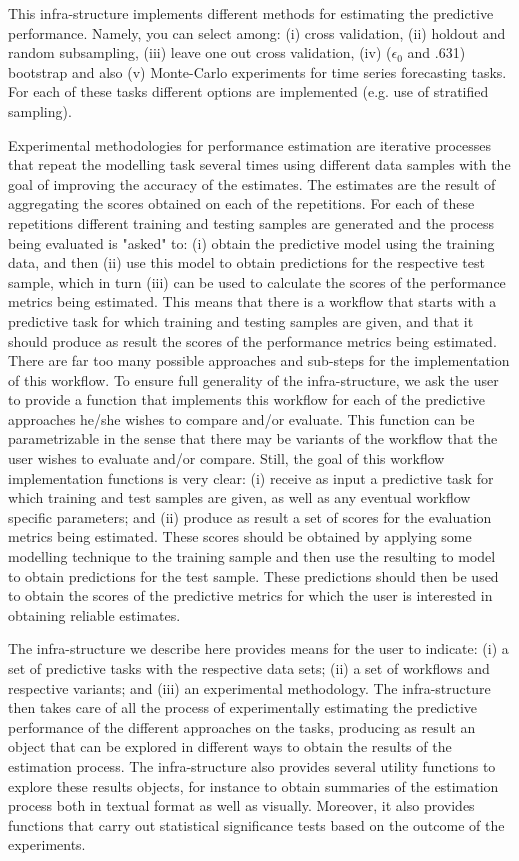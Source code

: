 \documentclass[10pt,a4paper]{article}\usepackage[]{graphicx}\usepackage[]{color}
\begin{document}
This infra-structure implements different methods for estimating the predictive performance. Namely, you can select among:  (i) cross validation, (ii) holdout and random subsampling, (iii) leave one out cross validation, (iv) ($\epsilon_0$ and .631) bootstrap and also (v) Monte-Carlo experiments for time series forecasting tasks. For each of these tasks different options are implemented (e.g. use of stratified sampling).

Experimental methodologies for performance estimation are iterative
processes that repeat the modelling task several times using different
data samples with the goal of improving the accuracy of the
estimates. The estimates are the result of aggregating the scores
obtained on each of the repetitions. For each of these
repetitions different training and testing samples are generated and
the process being evaluated is "asked" to: (i) obtain the predictive
model using the training data, and then (ii) use this model to obtain
predictions for the respective test sample, which in turn (iii) can be
used to calculate the scores of the performance metrics being
estimated. This means that there is a workflow that starts with a
predictive task for which training and testing samples are given, and
that it should produce as result the scores of the performance metrics
being estimated. There are far too many possible approaches and
sub-steps for the implementation of this workflow.  To ensure full
generality of the infra-structure, we ask the user to provide a
function that implements this workflow for each of the predictive
approaches he/she wishes to compare and/or evaluate. This function can
be parametrizable in the sense that there may be variants of the
workflow that the user wishes to evaluate and/or compare. Still, the
goal of this workflow implementation functions is very clear: (i)
receive as input a predictive task for which training  and  test
samples are given, as well as any eventual workflow specific parameters; and
(ii) produce as result a set of scores for the evaluation metrics
being estimated. These scores should be obtained by applying some
modelling technique to the training sample and then use the resulting
to model to obtain predictions for the test sample. These predictions
should then be used to obtain the scores of the predictive metrics for which the
user is interested in obtaining reliable estimates.

The infra-structure we describe here provides means for the user to
indicate: (i) a set of predictive tasks with the respective data sets;
(ii) a set of workflows and respective variants; and (iii) an
experimental methodology. The infra-structure then takes care of all
the process of experimentally estimating the predictive performance of the different approaches on
the tasks, producing as result an object that can be
explored in different ways to obtain the results of the estimation process.
The infra-structure also provides several utility functions
to explore these results objects, for instance to
obtain summaries of the estimation process both in textual format as well as
visually. Moreover, it also provides functions that carry out
statistical significance tests based on the outcome of the
experiments. 
\end{document}
